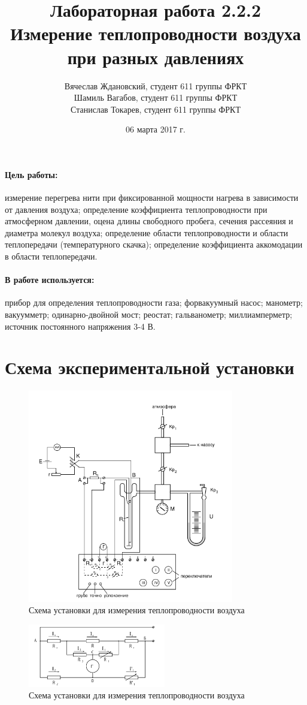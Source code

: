 \documentclass[a4paper]{article}
\title{Лабораторная работа 2.2.2 \\Измерение теплопроводности воздуха при разных давлениях}
\date{06 марта 2017 г.}
\author{Вячеслав Ждановский, студент 611 группы ФРКТ\\
Шамиль Вагабов, студент 611 группы ФРКТ\\
Станислав Токарев, студент 611 группы ФРКТ}
\begin{document}
	\maketitle
	\newpage
	\paragraph{Цель работы:}
	измерение перегрева нити при фиксированной мощности нагрева в зависимости от давления воздуха; определение коэффициента теплопроводности при атмосферном давлении, оцена длины свободного пробега, сечения рассеяния и диаметра молекул воздуха; определение области теплопроводности и области теплопередачи (температурного скачка); определение коэффициента аккомодации в области теплопередачи.
	\paragraph{В работе используется:} прибор для определения теплопроводности газа; форвакуумный насос; манометр; вакуумметр; одинарно-двойной мост; реостат; гальванометр; миллиамперметр; источник постоянного напряжения 3-4 В.
	\section{Схема экспериментальной установки}
	\begin{figure}[h!]
		\centering
		\includegraphics[width=90mm]{pic1.png}
		\caption{Схема установки для измерения теплопроводности воздуха \label{overflow}}
	\end{figure}
	\begin{figure}[h!]
		\centering
		\includegraphics[width=60mm]{pic2.png}
		\caption{Схема установки для измерения теплопроводности воздуха \label{overflow}}
	\end{figure}
\end{document}
